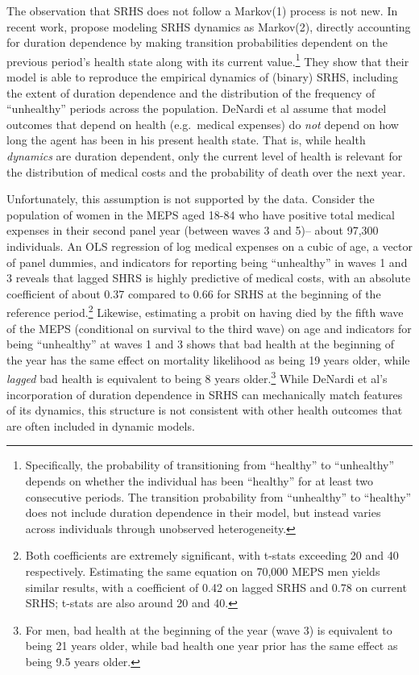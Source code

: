 \documentclass[12pt,pdftex,letterpaper]{article}
\begin{document}
The observation that SRHS does not follow a Markov(1) process is not new.  In recent work, \cite{DeNardi18} propose modeling SRHS dynamics as Markov(2), directly accounting for duration dependence by making transition probabilities dependent on the previous period's health state along with its current value.\footnote{Specifically, the probability of transitioning from ``healthy'' to ``unhealthy'' depends on whether the individual has been ``healthy'' for at least two consecutive periods.  The transition probability from ``unhealthy'' to ``healthy'' does not include duration dependence in their model, but instead varies across individuals through unobserved heterogeneity.}  They show that their model is able to reproduce the empirical dynamics of (binary) SRHS, including the extent of duration dependence and the distribution of the frequency of ``unhealthy'' periods across the population.  DeNardi et al assume that model outcomes that depend on health (e.g.\ medical expenses) do \textit{not} depend on how long the agent has been in his present health state. That is, while health \textit{dynamics} are duration dependent, only the current level of health is relevant for the distribution of medical costs and the probability of death over the next year.

Unfortunately, this assumption is not supported by the data.  Consider the population of women in the MEPS aged 18-84 who have positive total medical expenses in their second panel year (between waves 3 and 5)-- about 97,300 individuals.  An OLS regression of log medical expenses on a cubic of age, a vector of panel dummies, and indicators for reporting being ``unhealthy'' in waves 1 and 3 reveals that lagged SHRS is highly predictive of medical costs, with an absolute coefficient of about 0.37 compared to 0.66 for SRHS at the beginning of the reference period.\footnote{Both coefficients are extremely significant, with t-stats exceeding 20 and 40 respectively.  Estimating the same equation on 70,000 MEPS men yields similar results, with a coefficient of 0.42 on lagged SRHS and 0.78 on current SRHS; t-stats are also around 20 and 40.}  Likewise, estimating a probit on having died by the fifth wave of the MEPS (conditional on survival to the third wave) on age and indicators for being ``unhealthy'' at waves 1 and 3 shows that bad health at the beginning of the year has the same effect on mortality likelihood as being 19 years older, while \textit{lagged} bad health is equivalent to being 8 years older.\footnote{For men, bad health at the beginning of the year (wave 3) is equivalent to being 21 years older, while bad health one year prior has the same effect as being 9.5 years older.}  While DeNardi et al's incorporation of duration dependence in SRHS can mechanically match features of its dynamics, this structure is not consistent with other health outcomes that are often included in dynamic models.
\end{document}

